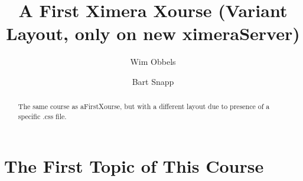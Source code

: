 \documentclass{xourse}
\author{Wim Obbels \and Bart Snapp}
\title{A First Ximera Xourse (Variant Layout, only on new ximeraServer)}
\begin{document}
\begin{abstract}
    The same course as aFirstXourse, but with a different layout due to presence of a specific .css file.
\end{abstract}
\maketitle
\part{The First Topic of This Course}

\chapterstyle
{}
\sectionstyle
{}

\chapterstyle
{}
\end{document}

